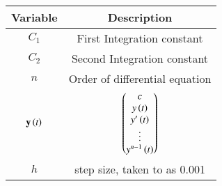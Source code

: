 \begin{tabular}[12pt]{ |c| c|}
    \hline
    \textbf{Variable} & \textbf{Description}\\ 
    \hline
    $C_1$ &First Integration constant\\
    \hline
    $C_2$ &Second Integration constant\\
    \hline
    $n$ & Order of differential equation\\
    \hline
    $\mathbf{y}\left(t\right)$ & $\begin{pmatrix}c \\ y\left(t\right) \\ y^\prime\left(t\right) \\ \vdots \\ y^{n-1}\left(t\right)\end{pmatrix}$\\
    \hline
    $h$ & step size, taken to as 0.001\\
    \hline
    \end{tabular}
